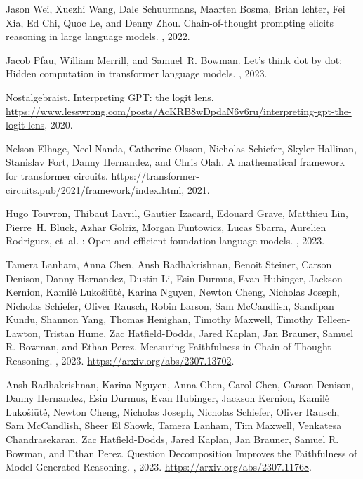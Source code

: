 \documentclass{article}
\begin{document}
\newpage
\begin{thebibliography}{12}

Jason Wei, Xuezhi Wang, Dale Schuurmans, Maarten Bosma, Brian Ichter, Fei Xia,
  Ed Chi, Quoc Le, and Denny Zhou.
\newblock Chain-of-thought prompting elicits reasoning in large language
  models.
, 2022.

Jacob Pfau, William Merrill, and Samuel~R. Bowman.
\newblock Let's think dot by dot: Hidden computation in transformer language
  models.
, 2023.

Nostalgebraist.
\newblock Interpreting {GPT}: the logit lens.
\newblock
  \url{https://www.lesswrong.com/posts/AcKRB8wDpdaN6v6ru/interpreting-gpt-the-logit-lens},
  2020.

Nelson Elhage, Neel Nanda, Catherine Olsson, Nicholas Schiefer, Skyler Hallinan,
  Stanislav Fort, Danny Hernandez, and Chris Olah.
\newblock A mathematical framework for transformer circuits.
\newblock
  \url{https://transformer-circuits.pub/2021/framework/index.html}, 2021.

Hugo Touvron, Thibaut Lavril, Gautier Izacard, Edouard Grave, Matthieu
  Lin, Pierre~H. Bluck, Azhar Golriz, Morgan Funtowicz, Lucas
  Sbarra, Aurelien Rodriguez, et~al.
: Open and efficient foundation language models.
, 2023.

Tamera Lanham, Anna Chen, Ansh Radhakrishnan, Benoit Steiner, Carson Denison, Danny Hernandez, Dustin Li, Esin Durmus, Evan Hubinger, Jackson Kernion, Kamilė Lukošiūtė, Karina Nguyen, Newton Cheng, Nicholas Joseph, Nicholas Schiefer, Oliver Rausch, Robin Larson, Sam McCandlish, Sandipan Kundu, Shannon Yang, Thomas Henighan, Timothy Maxwell, Timothy Telleen-Lawton, Tristan Hume, Zac Hatfield-Dodds, Jared Kaplan, Jan Brauner, Samuel R. Bowman, and Ethan Perez.
\newblock Measuring Faithfulness in Chain-of-Thought Reasoning.
, 2023.
\newblock \url{https://arxiv.org/abs/2307.13702}.

Ansh Radhakrishnan, Karina Nguyen, Anna Chen, Carol Chen, Carson Denison, Danny Hernandez, Esin Durmus, Evan Hubinger, Jackson Kernion, Kamilė Lukošiūtė, Newton Cheng, Nicholas Joseph, Nicholas Schiefer, Oliver Rausch, Sam McCandlish, Sheer El Showk, Tamera Lanham, Tim Maxwell, Venkatesa Chandrasekaran, Zac Hatfield-Dodds, Jared Kaplan, Jan Brauner, Samuel R. Bowman, and Ethan Perez.
\newblock Question Decomposition Improves the Faithfulness of Model-Generated Reasoning.
, 2023.
\newblock \url{https://arxiv.org/abs/2307.11768}.


\end{thebibliography}
\end{document}
